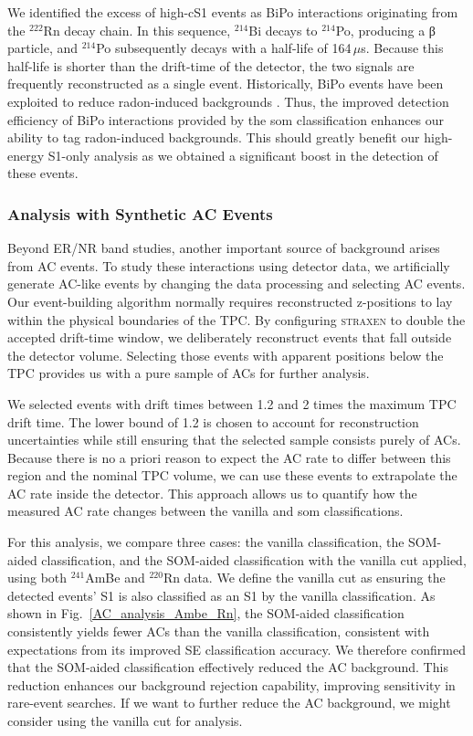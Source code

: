 We identified the excess of high-cS1 events as BiPo interactions originating from the $^{222}$Rn decay chain. In this sequence, $^{214}$Bi decays to $^{214}$Po, producing a β particle, and $^{214}$Po subsequently decays with a half-life of 164\,$\mu$s. Because this half-life is shorter than the drift-time of the detector, the two signals are frequently reconstructed as a single event. Historically, BiPo events have been exploited to reduce radon-induced backgrounds \cite{PhysRevD.110.012011}. Thus, the improved detection efficiency of BiPo interactions provided by the \acrshort{som} classification enhances our ability to tag radon-induced backgrounds. This should greatly benefit our high-energy S1-only analysis as we obtained a significant boost in the detection of these events. 

\subsubsection*{Analysis with Synthetic AC Events}

Beyond ER/NR band studies, another important source of background arises from AC events. To study these interactions using detector data, we artificially generate AC-like events by changing the data processing and selecting AC events. Our event-building algorithm normally requires reconstructed z-positions to lay within the physical boundaries of the TPC. By configuring \textsc{straxen} to double the accepted drift-time window, we deliberately reconstruct events that fall outside the detector volume. Selecting those events with apparent positions below the TPC provides us with a pure sample of ACs for further analysis.

We selected events with drift times between 1.2 and 2 times the maximum TPC drift time. The lower bound of 1.2 is chosen to account for reconstruction uncertainties while still ensuring that the selected sample consists purely of ACs. Because there is no a priori reason to expect the AC rate to differ between this region and the nominal TPC volume, we can use these events to extrapolate the AC rate inside the detector. This approach allows us to quantify how the measured AC rate changes between the vanilla and \acrshort{som} classifications.

For this analysis, we compare three cases: the vanilla classification, the SOM-aided classification, and the SOM-aided classification with the vanilla cut applied, using both $^{241}$AmBe and  $^{220}$Rn data. We define the vanilla cut as ensuring the detected events' S1 is also classified as an S1 by the vanilla classification. As shown in Fig.~\ref{AC_analysis_Ambe_Rn}, the SOM-aided classification consistently yields fewer ACs than the vanilla classification, consistent with expectations from its improved SE classification accuracy. We therefore confirmed that the SOM-aided classification effectively reduced the AC background. This reduction enhances our background rejection capability, improving sensitivity in rare-event searches. If we want to further reduce the AC background, we might consider using the vanilla cut for analysis.

